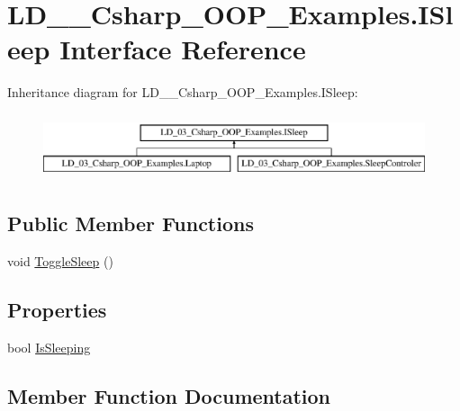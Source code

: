 \hypertarget{interface_l_d__03___csharp___o_o_p___examples_1_1_i_sleep}{}\section{L\+D\+\_\+\_\+\+Csharp\+\_\+\+O\+O\+P\+\_\+\+Examples.\+I\+Sleep Interface Reference}
\label{interface_l_d__03___csharp___o_o_p___examples_1_1_i_sleep}
Inheritance diagram for L\+D\+\_\+\_\+\+Csharp\+\_\+\+O\+O\+P\+\_\+\+Examples.\+I\+Sleep\+:\begin{figure}[H]
\begin{center}
\leavevmode
\includegraphics[height=1.937716cm]{interface_l_d__03___csharp___o_o_p___examples_1_1_i_sleep}
\end{center}
\end{figure}
\subsection*{Public Member Functions}
\begin{DoxyCompactItemize}
\item 
void \mbox{\hyperlink{interface_l_d__03___csharp___o_o_p___examples_1_1_i_sleep_a51a16beac9cf61fd4d088e169790bd08}{Toggle\+Sleep}} ()
\end{DoxyCompactItemize}
\subsection*{Properties}
\begin{DoxyCompactItemize}
\item 
bool \mbox{\hyperlink{interface_l_d__03___csharp___o_o_p___examples_1_1_i_sleep_a676dbf702e3243c35818e41970b77d90}{Is\+Sleeping}}
\end{DoxyCompactItemize}


\subsection{Member Function Documentation}
\mbox{\label{interface_l_d__03___csharp___o_o_p___examples_1_1_i_sleep_a51a16beac9cf61fd4d088e169790bd08}} 
